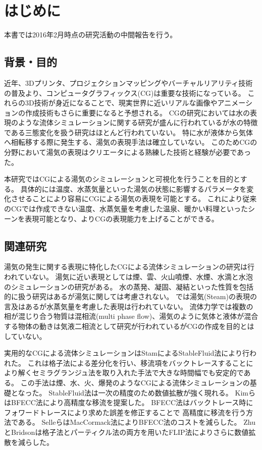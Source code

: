 \section{はじめに}
本書では2016年2月時点の研究活動の中間報告を行う。

\subsection{背景・目的}
近年、3Dプリンタ、プロジェクションマッピングやバーチャルリアリティ技術の普及より、コンピュータグラフィックス(CG)は重要な技術になっている。
これらの3D技術が身近になることで、現実世界に近いリアルな画像やアニメーションの作成技術もさらに重要になると予想される。 CGの研究においては水の表現のような流体シミュレーションに関する研究が盛んに行われているが水の特徴である三態変化を扱う研究はほとんど行われていない。
特に水が液体から気体へ相転移する際に発生する、湯気の表現手法は確立していない。
このためCGの分野において湯気の表現はクリエータによる熟練した技術と経験が必要であった。

本研究ではCGによる湯気のシミュレーションと可視化を行うことを目的とする。
具体的には温度、水蒸気量といった湯気の状態に影響するパラメータを変化させることにより容易にCGによる湯気の表現を可能とする。
これにより従来のCGでは作成できない温度、水蒸気量を考慮した温泉、暖かい料理といったシーンを表現可能となり、よりCGの表現能力を上げることができる。

\subsection{関連研究}
湯気の発生に関する表現に特化したCGによる流体シミュレーションの研究は行われていない。
湯気に近い表現としては煙\cite{Fedkiw2001}、雲\cite{Dobashi2000}\cite{Miyazaki2001}\cite{Miyazaki2002}、火山噴煙\cite{Mizuno2003}\cite{Mizuno2004}、水煙\cite{Nielsen2013}、水滴と水泡\cite{Mihalef2009}のシミュレーションの研究がある。
水の蒸発、凝固、凝結といった性質を包括的に扱う研究\cite{Fujisawa2008}はあるが湯気に関しては考慮されない。
\cite{Foster1997}では湯気(Steam)の表現の言及はあるが水蒸気量を考慮した表現は行われていない。
流体力学では複数の相が混じり合う物質は混相流(multi phase flow)、湯気のように気体と液体が混合する物体の動きは気液二相流として研究が行われているがCGの作成を目的とはしていない。

実用的なCGによる流体シミュレーションはStamによるStableFluid法\cite{Stam1999}により行われた。
これは格子法による差分化を行い、移流項をバックトレースすることにより解くセミラグランジュ法を取り入れた手法で大きな時間幅でも安定的である。
この手法は煙\cite{Fedkiw2001}、水\cite{Foster2001}、火\cite{Nguyen2002}、爆発\cite{Feldman2003}のようなCGによる流体シミュレーションの基礎となった。
StableFluid法は一次の精度のため数値拡散が強く現れる。
Kimら\cite{Kim2005}はBFECC法により高精度な移流を提案した。
BFECC法はバックトレース時にフォワードトレースにより求めた誤差を修正することで	高精度に移流を行う方法である。
Selleら\cite{Selle2008}はMacCormack法によりBFECC法のコストを減らした。
ZhuとBridson\cite{Zhu2005}は格子法とパーティクル法の両方を用いたFLIP法によりさらに数値拡散を減らした。

